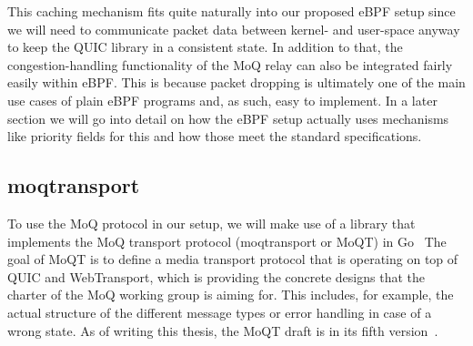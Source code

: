 This caching mechanism fits quite naturally into our proposed eBPF setup since we will need to 
communicate packet data between kernel- and user-space anyway to keep the QUIC library in a 
consistent state.
In addition to that, the congestion-handling functionality of the MoQ relay can also
be integrated fairly easily within eBPF\@.
This is because packet dropping is ultimately one of the main use cases of plain eBPF 
programs and, as such, easy to implement.
In a later section we will go into detail on how the eBPF setup actually uses mechanisms like 
priority fields for this and how those meet the standard specifications.

\subsection{moqtransport}
To use the MoQ protocol in our setup, we will make use of a library that implements 
the MoQ transport protocol (moqtransport or MoQT) in Go~\parencite{priority-moqtransport-repo}
The goal of MoQT is to define a media transport protocol that is operating on top
of QUIC and WebTransport, which is providing the concrete designs that the charter of 
the MoQ working group is aiming for.
This includes, for example, the actual structure of the different message types or error handling in case 
of a wrong state.
As of writing this thesis, the MoQT draft is in its fifth version~\parencite{draft-moqtransport}.

